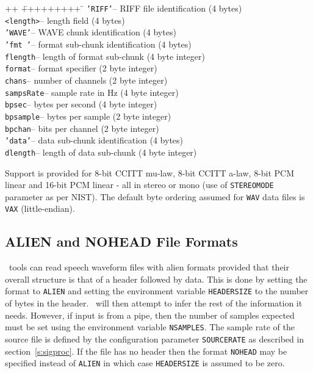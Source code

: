 \begin{tabbing}
++ \= +++++++++ \= \kill
\>\texttt{'RIFF'}\>-- RIFF file identification (4 bytes) \\
\>\texttt{<length>}\>-- length field (4 bytes)\\
\>\texttt{'WAVE'}\>-- WAVE chunk identification (4 bytes) \\
\>\texttt{'fmt '}\>-- format sub-chunk identification  (4 bytes) \\
\>\texttt{flength}\>-- length of format sub-chunk (4 byte integer) \\
\>\texttt{format}\>-- format specifier (2 byte integer) \\
\>\texttt{chans}\>-- number of channels (2 byte integer) \\
\>\texttt{sampsRate}\>-- sample rate in Hz (4 byte integer) \\
\>\texttt{bpsec}\>-- bytes per second (4 byte integer) \\
\>\texttt{bpsample}\>-- bytes per sample (2 byte integer) \\
\>\texttt{bpchan}\>-- bits per channel (2 byte integer) \\
\>\texttt{'data'}\>-- data sub-chunk identification  (4 bytes) \\
\>\texttt{dlength}\>-- length of data sub-chunk (4 byte integer)
\end{tabbing}
Support is provided for 8-bit CCITT mu-law, 8-bit CCITT a-law, 8-bit PCM 
linear and 16-bit PCM linear - all in stereo or mono (use of \texttt{STEREOMODE} 
parameter as per NIST).  The default byte ordering assumed for \texttt{WAV} 
data files is \texttt{VAX} (little-endian).

\subsection{ALIEN and NOHEAD File Formats}

\HTK\ tools can read speech waveform files with alien formats provided that
their overall structure is that of a header followed by data.  This is done by
setting the format to \texttt{ALIEN} and setting the environment variable
\texttt{HEADERSIZE} to the number of bytes in the header.  \HTK\ will then
attempt to infer the rest of the information it needs.  However, if input is
from a pipe, then the number of samples expected must be set using the
environment variable \texttt{NSAMPLES}.  The
sample rate of the source file is defined by the configuration parameter
\texttt{SOURCERATE} as described in section~\ref{s:sigproc}.  If the file has
no header then the format \texttt{NOHEAD} may be specified instead of
\texttt{ALIEN} in which case
\texttt{HEADERSIZE} is assumed to be
zero.


